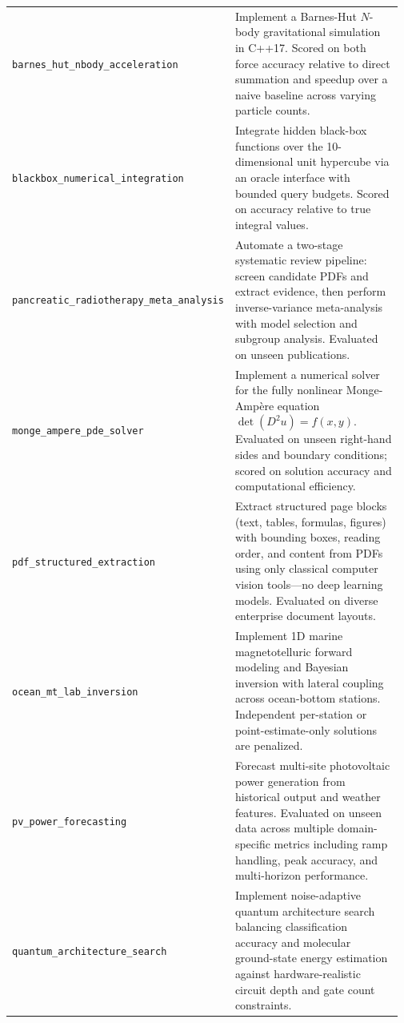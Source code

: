 \begin{longtable}{@{}>{\raggedright\arraybackslash}p{0.20\linewidth}>{\raggedright\arraybackslash}p{0.77\linewidth}@{}}
\tasknoterule
\texttt{barnes\_\allowbreak{}hut\_\allowbreak{}nbody\_\allowbreak{}acceleration} & Implement a Barnes-Hut $N$-body gravitational simulation in C++17. Scored on both force accuracy relative to direct summation and speedup over a naive baseline across varying particle counts. \\
\tasknoterule
\texttt{blackbox\_\allowbreak{}numerical\_\allowbreak{}integration} & Integrate hidden black-box functions over the 10-dimensional unit hypercube via an oracle interface with bounded query budgets. Scored on accuracy relative to true integral values. \\
\tasknoterule
\texttt{pancreatic\_\allowbreak{}radiotherapy\_\allowbreak{}meta\_\allowbreak{}analysis} & Automate a two-stage systematic review pipeline: screen candidate PDFs and extract evidence, then perform inverse-variance meta-analysis with model selection and subgroup analysis. Evaluated on unseen publications. \\
\tasknoterule
\texttt{monge\_\allowbreak{}ampere\_\allowbreak{}pde\_\allowbreak{}solver} & Implement a numerical solver for the fully nonlinear Monge-Amp\`ere equation $\det(D^2 u) = f(x,y)$. Evaluated on unseen right-hand sides and boundary conditions; scored on solution accuracy and computational efficiency. \\
\tasknoterule
\texttt{pdf\_\allowbreak{}structured\_\allowbreak{}extraction} & Extract structured page blocks (text, tables, formulas, figures) with bounding boxes, reading order, and content from PDFs using only classical computer vision tools---no deep learning models. Evaluated on diverse enterprise document layouts. \\
\tasknoterule
\texttt{ocean\_\allowbreak{}mt\_\allowbreak{}lab\_\allowbreak{}inversion} & Implement 1D marine magnetotelluric forward modeling and Bayesian inversion with lateral coupling across ocean-bottom stations. Independent per-station or point-estimate-only solutions are penalized. \\
\tasknoterule
\texttt{pv\_\allowbreak{}power\_\allowbreak{}forecasting} & Forecast multi-site photovoltaic power generation from historical output and weather features. Evaluated on unseen data across multiple domain-specific metrics including ramp handling, peak accuracy, and multi-horizon performance. \\
\tasknoterule
\texttt{quantum\_\allowbreak{}architecture\_\allowbreak{}search} & Implement noise-adaptive quantum architecture search balancing classification accuracy and molecular ground-state energy estimation against hardware-realistic circuit depth and gate count constraints. \\

\end{longtable}
